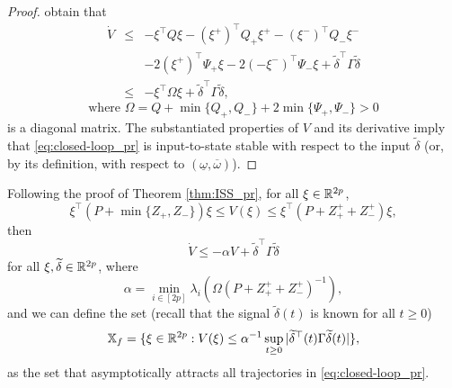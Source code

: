\documentclass[letterpaper, 10 pt, conference]{ieeeconf}  %
\begin{document}
\begin{proof}
obtain that
\begin{eqnarray*}
\dot{V} & \leq & -\xi^{\top}Q\xi-(\xi^{+})^{\top}Q_{+}\xi^{+}-(\xi^{-})^{\top}Q_{-}\xi^{-}\\
 &  & -2(\xi^{+})^{\top}\Psi_{+}\xi-2(-\xi^{-})^{\top}\Psi_{-}\xi+\tilde{\delta}^{\top}\Gamma\tilde{\delta}\\
 & \leq & -\xi^{\top}\Omega\xi+\tilde{\delta}^{\top}\Gamma\tilde{\delta},
\end{eqnarray*}
\[
\text{where }\Omega=Q+\min\{Q_{+},Q_{-}\}+2\min\{\Psi_{+},\Psi_{-}\}>0
\]
is a diagonal matrix. The substantiated properties of $V$ and its
derivative imply that \eqref{eq:closed-loop_pr} is input-to-state
stable \cite{Sontag:01:Springer,Dashkovskiy:11:AiT} with respect
to the input $\tilde{\delta}$ (or, by its definition, with respect
to $(\underline{\omega},\overline{\omega})$).
\end{proof}
Following the proof of Theorem \ref{thm:ISS_pr}, for all $\xi\in\mathbb{R}^{2p}$,
\[
\xi^{\top}(P+\min\{Z_{+},Z_{-}\})\xi\leq V(\xi)\leq\xi^{\top}(P+Z_{+}^{+}+Z_{-}^{+})\xi,
\]
then
\[
\dot{V}\leq-\alpha V+\tilde{\delta}^{\top}\Gamma\tilde{\delta}
\]
for all $\xi,\widetilde{\delta}\in\mathbb{R}^{2p}$, where
\[
\alpha=\min_{i\in[2p]}\lambda_{i}\left(\Omega(P+Z_{+}^{+}+Z_{-}^{+})^{-1}\right),
\]
and we can define the set (recall that the signal $\tilde{\delta}(t)$
is known for all $t\geq0$)
\begin{equation}
\mathbb{X}_{f}=\{\xi\in\mathbb{R}^{2p}:V(\xi)\leq\alpha^{-1}\sup_{t\geq0}|\widetilde{\delta}^{\top}(t)\Gamma\widetilde{\delta}(t)|\},\label{eq:X_f}
\end{equation}
as the set that asymptotically attracts all trajectories in \eqref{eq:closed-loop_pr}.
\end{document}
